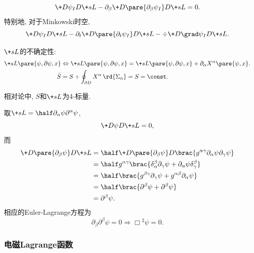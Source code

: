 \documentclass[hidelinks]{ctexart}
\begin{document}
\begin{cenum}
    \[ \+D{\psi_I}D{\+sL} - \partial_\beta \+D{\pare{\partial_\beta \psi_I}}D{\+sL} = 0. \]
    特别地, 对于Minkowski时空,
    \[ \+D{\psi_I}D{\+sL} - \partial_t \+D{\pare{\partial_t \psi_I}}D{\+sL} - \div \+D{\grad \psi_I}D{\+sL}. \]
    \item $\+sL$的不确定性:
    \begin{align*}
        \+sL\pare{\psi,\partial \psi, x} & \Leftrightarrow \+sL\pare{\psi,\partial \psi, x} = \+sL\pare{\psi,\partial \psi, x} + \partial_\alpha X^\alpha\pare{\psi,x}. \\
        \tilde{S} &= S + \oint_{\partial D}X^\alpha\,\rd{\Sigma_\alpha} = S = \const.
    \end{align*}
    \item 相对论中, $S$和$\+sL$为4-标量.
\end{cenum}
\begin{sample}
    \begin{ex}
        取$\displaystyle \+sL = \half \partial_\alpha \psi \partial^\alpha \psi$,
        \[ \+D{\psi}D{\+sL} = 0, \]
        而
       \begin{align*}
           \+D{\pare{\partial_\beta \psi}}D{\+sL} &= \half \+D{\pare{\partial_\beta \psi}}D{}\brac{g^{\alpha\gamma}\partial_\alpha \psi \partial_\gamma \psi} \\
           &= \half g^{\alpha\gamma}\brac{\delta_\alpha^\beta \partial_\gamma \psi + \partial_\alpha \psi \delta_\gamma^\beta} \\
           &= \half \brac{g^{\beta\gamma}\partial_\gamma \psi + g^{\alpha\beta}\partial_\alpha \psi} \\
           &= \half \brac{\partial^\beta \psi + \partial^\beta \psi} \\
           &= \partial^\beta \psi.
       \end{align*}
       相应的Euler-Lagrange方程为
       \[ \partial_\beta \partial^\beta \psi = 0 \Rightarrow \Box{}^2 \psi = 0. \]
    \end{ex}
\end{sample}


\subsubsection{电磁Lagrange函数} %
\label{ssub:电磁lagrange函数}
\end{document}
